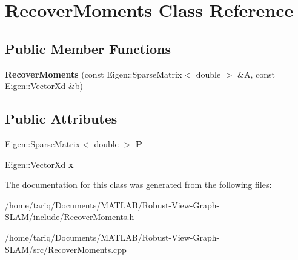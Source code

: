 \hypertarget{classRecoverMoments}{}\section{Recover\+Moments Class Reference}
\label{classRecoverMoments}
\subsection*{Public Member Functions}
\begin{DoxyCompactItemize}
\item 
{\bfseries Recover\+Moments} (const Eigen\+::\+Sparse\+Matrix$<$ double $>$ \&A, const Eigen\+::\+Vector\+Xd \&b)\hypertarget{classRecoverMoments_a8653cd56de0d2b208428d8d93e37431c}{}\label{classRecoverMoments_a8653cd56de0d2b208428d8d93e37431c}

\end{DoxyCompactItemize}
\subsection*{Public Attributes}
\begin{DoxyCompactItemize}
\item 
Eigen\+::\+Sparse\+Matrix$<$ double $>$ {\bfseries P}\hypertarget{classRecoverMoments_a3e1c991fafc11e3320b314b96e42e81a}{}\label{classRecoverMoments_a3e1c991fafc11e3320b314b96e42e81a}

\item 
Eigen\+::\+Vector\+Xd {\bfseries x}\hypertarget{classRecoverMoments_a7d791f3d785a9bbb47dfce68e100e481}{}\label{classRecoverMoments_a7d791f3d785a9bbb47dfce68e100e481}

\end{DoxyCompactItemize}


The documentation for this class was generated from the following files\+:\begin{DoxyCompactItemize}
\item 
/home/tariq/\+Documents/\+M\+A\+T\+L\+A\+B/\+Robust-\/\+View-\/\+Graph-\/\+S\+L\+A\+M/include/Recover\+Moments.\+h\item 
/home/tariq/\+Documents/\+M\+A\+T\+L\+A\+B/\+Robust-\/\+View-\/\+Graph-\/\+S\+L\+A\+M/src/Recover\+Moments.\+cpp\end{DoxyCompactItemize}
